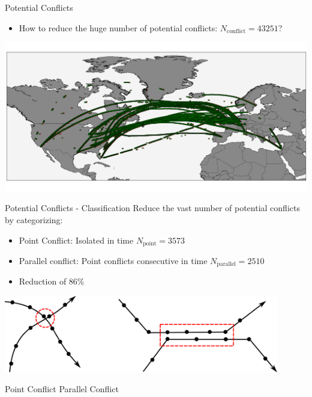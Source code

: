 \documentclass[10pt]{beamer}
\begin{document}
\begin{frame}[t]{Potential Conflicts}
    \begin{itemize}
        \item How to reduce the huge number of potential conflicts: $N_\text{conflict} = 43251$?
    \end{itemize}
    \includegraphics[width=1.0\textwidth]{images/spatial_conflicts_data.png}
\end{frame}
\begin{frame}[t]{Potential Conflicts - Classification}
    Reduce the vast number of potential conflicts by categorizing:
    \begin{itemize}
        \item Point Conflict: Isolated in time $N_\text{point} = 3573$
        \item Parallel conflict: Point conflicts consecutive in time $N_\text{parallel} = 2510$
        \item Reduction of $86 \%$
    \end{itemize}
    \begin{center}
        \includegraphics[width=0.9\textwidth]{images/spatial_conflict_categories.pdf}
    \end{center}
    \hspace{1.0cm}
    Point Conflict
    \hspace{3.5cm}
    Parallel Conflict
\end{frame}
\end{document}
